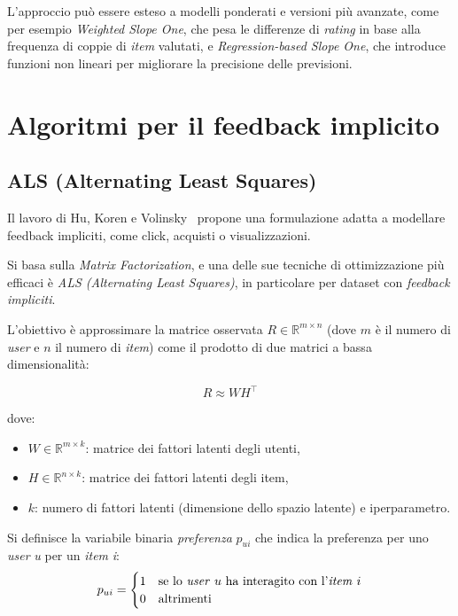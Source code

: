 L'approccio può essere esteso a modelli ponderati e versioni più avanzate, come per esempio \textit{Weighted Slope One}, che pesa le differenze di \textit{rating} in base alla frequenza di coppie di \textit{item} valutati, e \textit{Regression-based Slope One}, che introduce funzioni non lineari per migliorare la precisione delle previsioni.

\section{Algoritmi per il feedback implicito}\label{algoritmi-per-feedback-implicito}

\subsection{ALS (Alternating Least Squares)}\label{als}

Il lavoro di Hu, Koren e Volinsky~\cite{ALS} propone una formulazione adatta a modellare feedback impliciti, come click, acquisti o visualizzazioni.

Si basa sulla \textit{Matrix Factorization}, e una delle sue tecniche di ottimizzazione più efficaci è \textit{ALS (Alternating Least Squares)}, in particolare per dataset con \textit{feedback impliciti}.

L'obiettivo è approssimare la matrice osservata $R \in \mathbb{R}^{m \times n}$ (dove $m$ è il numero di \textit{user} e $n$ il numero di \textit{item}) come il prodotto di due matrici a bassa dimensionalità:

\[
R \approx W H^\top
\]

dove:

\begin{itemize}
    \item $W \in \mathbb{R}^{m \times k}$: matrice dei fattori latenti degli utenti,
    \item $H \in \mathbb{R}^{n \times k}$: matrice dei fattori latenti degli item,
    \item $k$: numero di fattori latenti (dimensione dello spazio latente) e iperparametro.
\end{itemize}

Si definisce la variabile binaria \textit{preferenza} $p_{ui}$ che indica la preferenza per uno \textit{user} \textit{u} per un \textit{item} \textit{i}:
\[
p_{ui} =
\begin{cases}
    1 & \text{se lo \textit{user} } u \text{ ha interagito con l'\textit{item} } i \\
    0 & \text{altrimenti}
\end{cases}
\]

